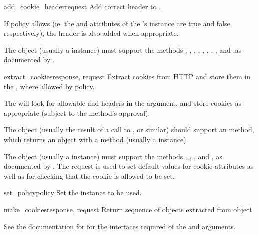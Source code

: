 \begin{methoddesc}[CookieJar]{add_cookie_header}{request}
Add correct  header to .

If policy allows (ie. the  and 
attributes of the 's  instance
are true and false respectively), the  header is
also added when appropriate.

The  object (usually a  instance)
must support the methods , ,
, ,
, ,
, , and
,as documented by .
\end{methoddesc}

\begin{methoddesc}[CookieJar]{extract_cookies}{response, request}
Extract cookies from HTTP  and store them in the
, where allowed by policy.

The  will look for allowable 
and  headers in the  argument,
and store cookies as appropriate (subject to the
 method's approval).

The  object (usually the result of a call to
, or similar) should support an
 method, which returns an object with a
 method (usually a
 instance).

The  object (usually a  instance)
must support the methods , ,
, and , as
documented by .  The request is used to set default
values for cookie-attributes as well as for checking that the cookie
is allowed to be set.
\end{methoddesc}

\begin{methoddesc}[CookieJar]{set_policy}{policy}
Set the  instance to be used.
\end{methoddesc}

\begin{methoddesc}[CookieJar]{make_cookies}{response, request}
Return sequence of  objects extracted from
 object.

See the documentation for  for the interfaces
required of the  and  arguments.
\end{methoddesc}

